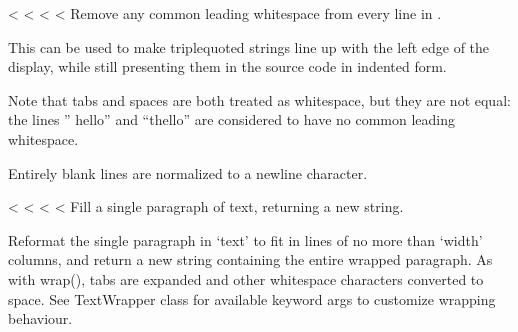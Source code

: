 \documentclass[letterpaper,10pt,english]{sphinxmanual}
\begin{document}
\begin{savenotes}
\begin{savenotes}
\begin{savenotes}
\begin{savenotes}

\begin{fulllineitems}
\label{\detokenize{index:textwrap.dedent}}
<%
\pysigstartsignatures
<%
<%
<%
Remove any common leading whitespace from every line in .

This can be used to make triple\sphinxhyphen{}quoted strings line up with the left
edge of the display, while still presenting them in the source code
in indented form.

Note that tabs and spaces are both treated as whitespace, but they
are not equal: the lines ”  hello” and “thello” are
considered to have no common leading whitespace.

Entirely blank lines are normalized to a newline character.

\end{fulllineitems}


\begin{fulllineitems}
\label{\detokenize{index:textwrap.fill}}
<%
\pysigstartsignatures
<%
<%
<%
Fill a single paragraph of text, returning a new string.

Reformat the single paragraph in ‘text’ to fit in lines of no more
than ‘width’ columns, and return a new string containing the entire
wrapped paragraph.  As with wrap(), tabs are expanded and other
whitespace characters converted to space.  See TextWrapper class for
available keyword args to customize wrapping behaviour.

\end{fulllineitems}


\end{savenotes}
\end{savenotes}
\end{savenotes}
\end{savenotes}
\end{document}
